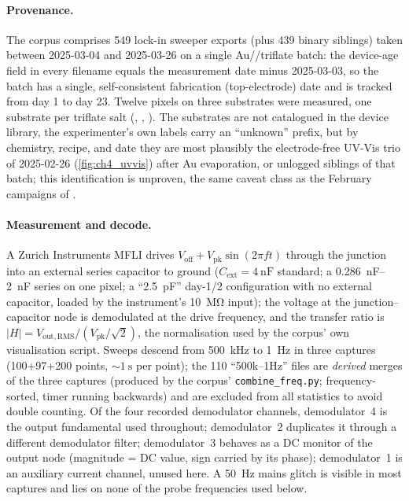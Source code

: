 \paragraph{Provenance.} The corpus comprises \num{549} lock-in sweeper exports
(plus \num{439} binary siblings) taken between 2025-03-04 and 2025-03-26 on a
single Au/\TMPE{}/triflate batch: the device-age field in every filename
equals the measurement date minus 2025-03-03, so the batch has a single,
self-consistent fabrication (top-electrode) date and is tracked from day 1 to
day 23. Twelve pixels on three substrates were measured, one substrate per
triflate salt (, , ). The substrates are not catalogued in
the device library, the experimenter's own labels carry an ``unknown''
prefix, but by chemistry, recipe, and date they are most plausibly the
electrode-free UV-Vis trio of 2025-02-26 (\cref{fig:ch4_uvvis}) after Au
evaporation, or unlogged siblings of that batch; this identification is
unproven, the same caveat class as the February campaigns of
.

\paragraph{Measurement and decode.} A Zurich Instruments MFLI drives
\(V_\mathrm{off} + V_\mathrm{pk}\sin(2\pi f t)\) through the junction into an
external series capacitor to ground (\(C_\mathrm{ext}=\SI{4}{\nano\farad}\)
standard; a \SIrange{0.286}{2}{\nano\farad} series on one pixel; a
``\SI{2.5}{\pico\farad}'' day-1/2 configuration with no external capacitor,
loaded by the instrument's \SI{10}{\mega\ohm} input); the voltage at the
junction--capacitor node is demodulated at the drive frequency, and the
transfer ratio is \(|H| = V_\mathrm{out,RMS}/(V_\mathrm{pk}/\sqrt{2})\), the
normalisation used by the corpus' own visualisation script. Sweeps descend
from \SI{500}{\kilo\hertz} to \SI{1}{\hertz} in three captures
(\num{100}+\num{97}+\num{200} points, \(\sim\!\SI{1}{\second}\) per point);
the \num{110} ``500k--1Hz'' files are \emph{derived} merges of the three
captures (produced by the corpus' \texttt{combine\_freq.py}; frequency-sorted,
timer running backwards) and are excluded from all statistics to avoid double
counting. Of the four recorded demodulator channels, demodulator~4 is the
output fundamental used throughout; demodulator~2 duplicates it through a
different demodulator filter; demodulator~3 behaves as a DC monitor of the
output node (magnitude = DC value, sign carried by its phase); demodulator~1
is an auxiliary current channel, unused here. A \SI{50}{\hertz} mains glitch
is visible in most captures and lies on none of the probe frequencies used
below.

